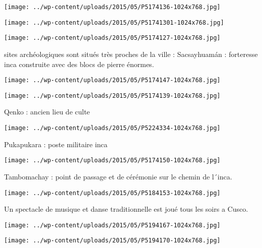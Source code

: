  \newline
\centerline{\texttt{[image: ../wp-content/uploads/2015/05/P5174136-1024x768.jpg]} } 
 \newline
 \newline
\centerline{\texttt{[image: ../wp-content/uploads/2015/05/P51741301-1024x768.jpg]} } 
 \newline
 \newline
\centerline{\texttt{[image: ../wp-content/uploads/2015/05/P5174127-1024x768.jpg]} } 
  sites archéologiques sont situés très proches de la ville : \newline
 Sacsayhuamán : forteresse inca construite avec des blocs de pierre énormes. \newline
 \newline
\centerline{\texttt{[image: ../wp-content/uploads/2015/05/P5174147-1024x768.jpg]} } 
 \newline
 \newline
\centerline{\texttt{[image: ../wp-content/uploads/2015/05/P5174139-1024x768.jpg]} } 
 \newline
 Qenko : ancien lieu de culte \newline
 \newline
\centerline{\texttt{[image: ../wp-content/uploads/2015/05/P5224334-1024x768.jpg]} } 
 \newline
 Pukapukara : poste militaire inca \newline
 \newline
\centerline{\texttt{[image: ../wp-content/uploads/2015/05/P5174150-1024x768.jpg]} } 
 \newline
 Tambomachay : point de passage et de cérémonie sur le chemin de l´inca. \newline
 \newline
\centerline{\texttt{[image: ../wp-content/uploads/2015/05/P5184153-1024x768.jpg]} } 
 \newline
 Un spectacle de musique et danse traditionnelle est joué tous les soirs a Cusco. \newline
 \newline
\centerline{\texttt{[image: ../wp-content/uploads/2015/05/P5194167-1024x768.jpg]} } 
 \newline
 \newline
\centerline{\texttt{[image: ../wp-content/uploads/2015/05/P5194170-1024x768.jpg]} } 
 \newline
